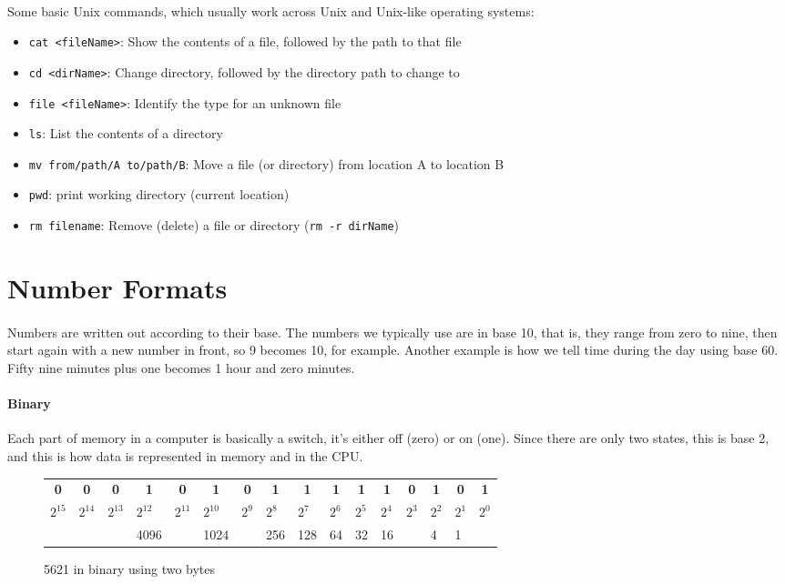 \documentclass[letter,11pt]{article}
\newcommand*{\thead}[1]{\multicolumn{1}{c}{\bfseries #1}}
\begin{document}
\paragraph{}Some basic Unix commands, which usually work across Unix and Unix-like operating systems:
\begin{itemize}
    \item \texttt{cat <fileName>}: Show the contents of a file, followed by the path to that file
    \item \texttt{cd <dirName>}: Change directory, followed by the directory path to change to
    \item \texttt{file <fileName>}: Identify the type for an unknown file
    \item \texttt{ls}: List the contents of a directory
    \item \texttt{mv from/path/A to/path/B}: Move a file (or directory) from location A to location B
    \item \texttt{pwd}: print working directory (current location)
    \item \texttt{rm filename}: Remove (delete) a file or directory (\texttt{rm -r dirName})
\end{itemize}

\FloatBarrier
\section{Number Formats}
\paragraph{}Numbers are written out according to their base. The numbers we typically use are in base 10, that is, they range from zero to nine, then start again with a new number in front, so 9 becomes 10, for example. Another example is how we tell time during the day using base 60. Fifty nine minutes plus one becomes 1 hour and zero minutes.

\paragraph{Binary}Each part of memory in a computer is basically a switch, it's either off (zero) or on (one). Since there are only two states, this is base 2, and this is how data is represented in memory and in the CPU.

\begin{figure}[h!]
    \centering
    \begin{tabular}{ l l l l l l l l| l l l l l l l l }
        \thead{0} & \thead{0} & \thead{0} & \thead{1} & \thead{0} & \thead{1} & \thead{0} & \thead{1} & \thead{1} & \thead{1} & \thead{1} & \thead{1} & \thead{0} & \thead{1} & \thead{0} & \thead{1} \\
        $2^{15}$ & $2^{14}$ & $2^{13}$ & $2^{12}$ & $2^{11}$ & $2^{10}$ & $2^9$ & $2^8$ & $2^7$ & $2^6$ & $2^5$ & $2^4$ & $2^3$ & $2^2$ & $2^1$ & $2^0$ \\
        & & & 4096 & & 1024 & & 256 & 128 & 64 & 32 & 16 & & 4 & 1
    \end{tabular}
    \caption{5621 in binary using two bytes}
    \label{fig:binarychart}
\end{figure}
\end{document}

